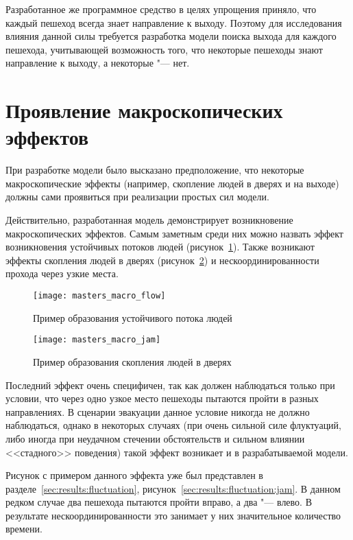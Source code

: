 Разработанное же программное средство в целях упрощения приняло, что каждый пешеход всегда знает направление к выходу.
Поэтому для исследования влияния данной силы требуется разработка модели поиска выхода для каждого пешехода, учитывающей
возможность того, что некоторые пешеходы знают направление к выходу, а некоторые "--- нет.

\section{Проявление макроскопических эффектов}
\label{sec:results:macro}

При разработке модели было высказано предположение, что некоторые макроскопические эффекты
(например, скопление людей в дверях и на выходе) должны сами проявиться при реализации простых сил модели.

Действительно, разработанная модель демонстрирует возникновение макроскопических эффектов.
Самым заметным среди них можно назвать эффект возникновения устойчивых потоков людей (рисунок~\ref{sec:results:macro:flow}).
Также возникают эффекты скопления людей в дверях (рисунок~\ref{sec:results:macro:jam}) и
нескоординированности прохода через узкие места.

\begin{figure}[ht!]
  \centering
  \texttt{[image: masters\_macro\_flow]}
  \caption{Пример образования устойчивого потока людей}
  \label{sec:results:macro:flow}
\end{figure}

\begin{figure}[ht!]
  \centering
  \texttt{[image: masters\_macro\_jam]}
  \caption{Пример образования скопления людей в дверях}
  \label{sec:results:macro:jam}
\end{figure}

Последний эффект очень специфичен, так как должен наблюдаться только при условии,
что через одно узкое место пешеходы пытаются пройти в разных направлениях.
В сценарии эвакуации данное условие никогда не должно наблюдаться, однако в некоторых случаях
(при очень сильной силе флуктуаций, либо иногда при неудачном стечении обстоятельств и сильном влиянии
<<стадного>> поведения) такой эффект возникает и в разрабатываемой модели.

Рисунок с примером данного эффекта уже был представлен в разделе~\ref{sec:results:fluctuation}, рисунок~\ref{sec:results:fluctuation:jam}.
В данном редком случае два пешехода пытаются пройти вправо, а два "--- влево.
В результате нескоординированности это занимает у них значительное количество времени.



